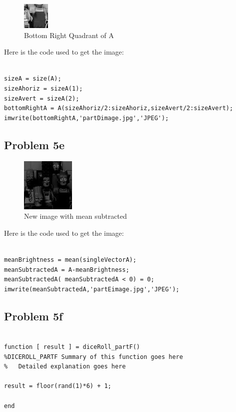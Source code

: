 \documentclass[11pt,psfig]{article}
\begin{document}
\begin{figure}[H]
\centering
\includegraphics[height=0.5in]{partDimage.jpg}
\caption{Bottom Right Quadrant of A}
\end{figure}

Here is the code used to get the image:

\begin{verbatim}

sizeA = size(A);
sizeAhoriz = sizeA(1);
sizeAvert = sizeA(2);
bottomRightA = A(sizeAhoriz/2:sizeAhoriz,sizeAvert/2:sizeAvert);
imwrite(bottomRightA,'partDimage.jpg','JPEG');

\end{verbatim}

\subsection*{Problem 5e}

\begin{figure}[H]
\centering
\includegraphics[height=1in]{partEimage.jpg}
\caption{New image with mean subtracted}
\end{figure}

Here is the code used to get the image:

\begin{verbatim}

meanBrightness = mean(singleVectorA);
meanSubtractedA = A-meanBrightness;
meanSubtractedA( meanSubtractedA < 0) = 0;
imwrite(meanSubtractedA,'partEimage.jpg','JPEG');

\end{verbatim}

\subsection*{Problem 5f}

\begin{verbatim}

function [ result ] = diceRoll_partF()
%DICEROLL_PARTF Summary of this function goes here
%   Detailed explanation goes here

result = floor(rand(1)*6) + 1;

end

\end{verbatim}
\end{document}
